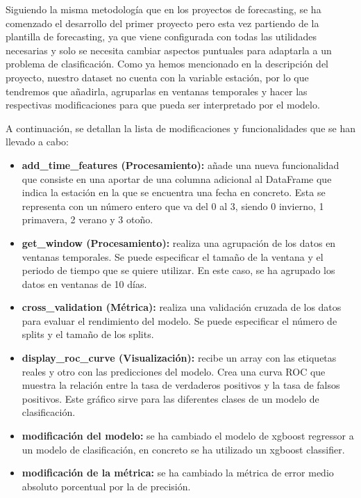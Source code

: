 Siguiendo la misma metodología que en los proyectos de forecasting, se ha comenzado
el desarrollo del primer proyecto pero esta vez partiendo de la plantilla de forecasting,
ya que viene configurada con todas las utilidades necesarias y solo se necesita cambiar
aspectos puntuales para adaptarla a un problema de clasificación. Como ya hemos mencionado
en la descripción del proyecto, nuestro dataset no cuenta con la variable estación, por lo
que tendremos que añadirla, agruparlas en ventanas temporales y hacer las respectivas modificaciones
para que pueda ser interpretado por el modelo.\medskip

A continuación, se detallan la lista de modificaciones y funcionalidades que se han llevado a cabo:

\begin{itemize}
    \item \textbf{add\_time\_features (Procesamiento):} añade una nueva funcionalidad que
    consiste en una aportar de una columna adicional al DataFrame que indica
    la estación en la que se encuentra una fecha en concreto. Esta se representa con un número entero
    que va del 0 al 3, siendo 0 invierno, 1 primavera, 2 verano y 3 otoño.
    \item \textbf{get\_window (Procesamiento):} realiza una agrupación de los datos en ventanas
    temporales. Se puede especificar el tamaño de la ventana y el periodo de tiempo que se quiere
    utilizar. En este caso, se ha agrupado los datos en ventanas de 10 días.
    \item \textbf{cross\_validation (Métrica):} realiza una validación cruzada de los datos
    para evaluar el rendimiento del modelo. Se puede especificar el número de splits y el tamaño
    de los splits. 
    \item \textbf{display\_roc\_curve (Visualización):} recibe un array con las etiquetas reales
    y otro con las predicciones del modelo. Crea una curva ROC que muestra la relación entre
    la tasa de verdaderos positivos y la tasa de falsos positivos. Este gráfico sirve para
    las diferentes clases de un modelo de clasificación.
    \item \textbf{modificación del modelo:} se ha cambiado el modelo de xgboost regressor a un modelo de
    clasificación, en concreto se ha utilizado un xgboost classifier. 
    \item \textbf{modificación de la métrica:} se ha cambiado la métrica de error medio absoluto porcentual
    por la de precisión.
\end{itemize}

